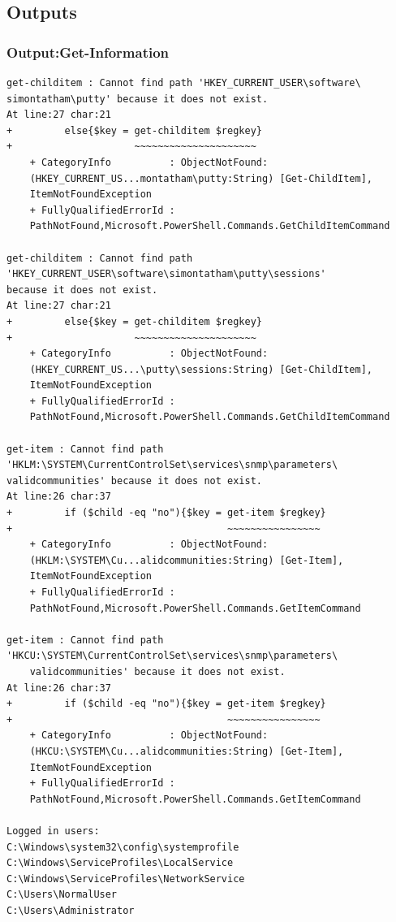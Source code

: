 \documentclass{article}%
\begin{document}
\subsection{Outputs}
\hypertarget{output1}{\subsubsection{Output:Get-Information}}
\begin{verbatim}
get-childitem : Cannot find path 'HKEY_CURRENT_USER\software\
simontatham\putty' because it does not exist.
At line:27 char:21
+         else{$key = get-childitem $regkey}
+                     ~~~~~~~~~~~~~~~~~~~~~
    + CategoryInfo          : ObjectNotFound: 
    (HKEY_CURRENT_US...montatham\putty:String) [Get-ChildItem],
    ItemNotFoundException
    + FullyQualifiedErrorId :
    PathNotFound,Microsoft.PowerShell.Commands.GetChildItemCommand
 
get-childitem : Cannot find path
'HKEY_CURRENT_USER\software\simontatham\putty\sessions'
because it does not exist.
At line:27 char:21
+         else{$key = get-childitem $regkey}
+                     ~~~~~~~~~~~~~~~~~~~~~
    + CategoryInfo          : ObjectNotFound:
    (HKEY_CURRENT_US...\putty\sessions:String) [Get-ChildItem], 
    ItemNotFoundException
    + FullyQualifiedErrorId :
    PathNotFound,Microsoft.PowerShell.Commands.GetChildItemCommand
 
get-item : Cannot find path
'HKLM:\SYSTEM\CurrentControlSet\services\snmp\parameters\
validcommunities' because it does not exist.
At line:26 char:37
+         if ($child -eq "no"){$key = get-item $regkey}
+                                     ~~~~~~~~~~~~~~~~
    + CategoryInfo          : ObjectNotFound:
    (HKLM:\SYSTEM\Cu...alidcommunities:String) [Get-Item], 
    ItemNotFoundException
    + FullyQualifiedErrorId :
    PathNotFound,Microsoft.PowerShell.Commands.GetItemCommand
 
get-item : Cannot find path
'HKCU:\SYSTEM\CurrentControlSet\services\snmp\parameters\
    validcommunities' because it does not exist.
At line:26 char:37
+         if ($child -eq "no"){$key = get-item $regkey}
+                                     ~~~~~~~~~~~~~~~~
    + CategoryInfo          : ObjectNotFound:
    (HKCU:\SYSTEM\Cu...alidcommunities:String) [Get-Item], 
    ItemNotFoundException
    + FullyQualifiedErrorId :
    PathNotFound,Microsoft.PowerShell.Commands.GetItemCommand

Logged in users:
C:\Windows\system32\config\systemprofile
C:\Windows\ServiceProfiles\LocalService
C:\Windows\ServiceProfiles\NetworkService
C:\Users\NormalUser
C:\Users\Administrator


\end{verbatim}
\end{document}
